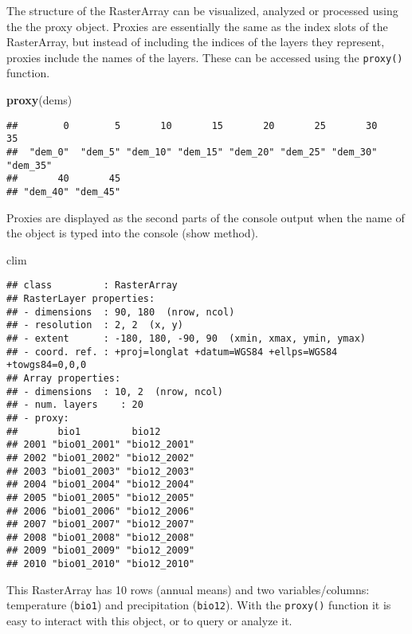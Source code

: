 \documentclass[]{article}
\newenvironment{Shaded}{\begin{snugshade}}{\end{snugshade}}
\newcommand{\KeywordTok}[1]{\textcolor[rgb]{0.13,0.29,0.53}{\textbf{#1}}}
\newcommand{\NormalTok}[1]{#1}
\begin{document}
The structure of the RasterArray can be visualized, analyzed or
processed using the the proxy object. Proxies are essentially the same
as the index slots of the RasterArray, but instead of including the
indices of the layers they represent, proxies include the names of the
layers. These can be accessed using the \texttt{proxy()} function.

\begin{Shaded}
\begin{Highlighting}[]
\KeywordTok{proxy}\NormalTok{(dems)}
\end{Highlighting}
\end{Shaded}

\begin{verbatim}
##        0        5       10       15       20       25       30       35 
##  "dem_0"  "dem_5" "dem_10" "dem_15" "dem_20" "dem_25" "dem_30" "dem_35" 
##       40       45 
## "dem_40" "dem_45"
\end{verbatim}

Proxies are displayed as the second parts of the console output when the
name of the object is typed into the console (show method).

\begin{Shaded}
\begin{Highlighting}[]
\NormalTok{clim}
\end{Highlighting}
\end{Shaded}

\begin{verbatim}
## class         : RasterArray 
## RasterLayer properties: 
## - dimensions  : 90, 180  (nrow, ncol)
## - resolution  : 2, 2  (x, y)
## - extent      : -180, 180, -90, 90  (xmin, xmax, ymin, ymax)
## - coord. ref. : +proj=longlat +datum=WGS84 +ellps=WGS84 +towgs84=0,0,0 
## Array properties: 
## - dimensions  : 10, 2  (nrow, ncol)
## - num. layers    : 20
## - proxy:
##       bio1         bio12       
## 2001 "bio01_2001" "bio12_2001"
## 2002 "bio01_2002" "bio12_2002"
## 2003 "bio01_2003" "bio12_2003"
## 2004 "bio01_2004" "bio12_2004"
## 2005 "bio01_2005" "bio12_2005"
## 2006 "bio01_2006" "bio12_2006"
## 2007 "bio01_2007" "bio12_2007"
## 2008 "bio01_2008" "bio12_2008"
## 2009 "bio01_2009" "bio12_2009"
## 2010 "bio01_2010" "bio12_2010"
\end{verbatim}

This RasterArray has 10 rows (annual means) and two variables/columns:
temperature (\texttt{bio1}) and precipitation (\texttt{bio12}). With the
\texttt{proxy()} function it is easy to interact with this object, or to
query or analyze it.
\end{document}
